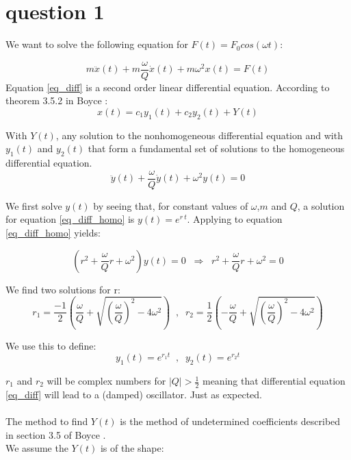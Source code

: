 \section{question 1}

We want to solve the following equation for $F(t) = F_0 cos(\omega t)$:

\begin{equation}
	m \ddot{x}(t) + m \frac{\omega}{Q} \dot{x}(t) + m \omega^2 x(t) = F(t)
	\label{eq_diff}
\end{equation}
Equation \ref{eq_diff} is a second order linear differential equation. According to theorem 3.5.2 in Boyce \cite{Boyce}:
\begin{equation}
	x(t) = c_1 y_1(t) + c_2 y_2(t) + Y(t)
	\label{eq_x_1_emtpy}
\end{equation}

With $Y(t)$, any solution to the nonhomogeneous differential equation and with $y_1(t)$ and $y_2(t)$ that form a fundamental set of solutions to the homogeneous differential equation.
\begin{equation}
	\ddot{y}(t) + \frac{\omega}{Q} \dot{y}(t) + \omega^2 y(t) = 0
	\label{eq_diff_homo}
\end{equation}

We first solve $y(t)$ by seeing that, for constant values of $\omega$,$m$ and $Q$, a solution for equation \ref{eq_diff_homo} is  $y(t) = e^{r \: t}$. Applying to equation \ref{eq_diff_homo} yields:

\begin{equation}
	(r^2 + \frac{\omega}{Q} r + \omega^2) y(t) = 0 \; \; \Rightarrow \; \; r^2 + \frac{\omega}{Q} r + \omega^2 = 0
	\label{eq_characteristic}
\end{equation}

We find two solutions for r:
\begin{equation*}
	r_1 = \frac{-1}{2} \left( \frac{\omega}{Q} + \sqrt{\left( \frac{\omega}{Q} \right)^2 -4 \omega^2} \right) \; \; , \; \; r_2 = \frac{1}{2} \left( -\frac{\omega}{Q} + \sqrt{\left( \frac{\omega}{Q} \right)^2 -4 \omega^2} \right)
\end{equation*}

We use this to define:
\begin{equation*}
	y_1(t) = e^{r_1 t} \; \; , \; \; y_2(t) = e^{r_2 t}
\end{equation*}

$r_1$ and $r_2$ will be complex numbers for $\mid Q \mid > \frac{1}{2}$ meaning that differential equation \ref{eq_diff} will lead to a (damped) oscillator. Just as expected.\\
\\
The method to find $Y(t)$ is the method of undetermined coefficients described in section 3.5 of Boyce \cite{Boyce}.\\
We assume the $Y(t)$ is of the shape:

